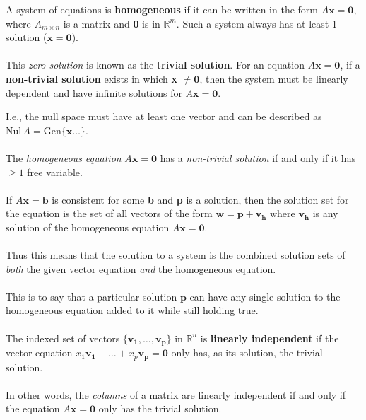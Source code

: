 \documentclass[12pt]{article}
\newcommand{\gen}[1]{\mathrm{Gen}\{{#1}\}}
\newcommand{\R}{\mathbb{R}}
\newcommand{\bt}[1]{\textbf{{#1}}}
\newcommand{\bm}[1]{\mathbf{{#1}}}
\begin{document}
A system of equations is \bt{homogeneous} if it can be written in the form $A\bm{x = 0}$, where $A_{m\times n}$ is a matrix
and \bt{0} is in $\R^m$. Such a system always has at least 1 solution ($\bm{x = 0}$). \\ \\

This \emph{zero solution} is known as the \bt{trivial solution}. For an equation $A\bm{x = 0}$, if a
\bt{non-trivial solution} exists in which \bt{x} $\neq \bm{0}$, then the system must be linearly dependent and have infinite solutions for $A\bm{x} = \bm{0}$.

I.e., the null space must have at least one vector and can be described as $\textrm{Nul}\,A = \gen{\bm{x}\dots}$. \\ \\

The \emph{homogeneous equation} $A\bm{x = 0}$ has a \emph{non-trivial solution} if and only if it has $\geq 1$ free variable. \\ \\

If $A\bm{x = b}$ is consistent for some \bt{b} and \bt{p} is a solution, then the solution set for the equation is
the set of all vectors of the form $\bm{w = p + v_h}$ where $\bm{v_h}$ is any solution of the homogeneous equation $A\bm{x = 0}$. \\ \\

Thus this means that the solution to a system is the combined solution sets of \emph{both} the given vector equation \emph{and} the homogeneous equation. \\ \\

This is to say that a particular solution $\bm{p}$ can have any single solution to the homogeneous equation added to it while still holding true. \\ \\

The indexed set of vectors $\{\bm{v_1},\dots,\bm{v_p}\}$ in $\R^n$ is \bt{linearly independent} if the vector equation
$x_1\bm{v_1} + \dots + x_p\bm{v_p = 0}$ only has, as its solution, the trivial solution. \\ \\

In other words, the \emph{columns} of a matrix are linearly independent if and only if the equation $A\bm{x = 0}$ only has the trivial solution. \\ \\
\end{document}
